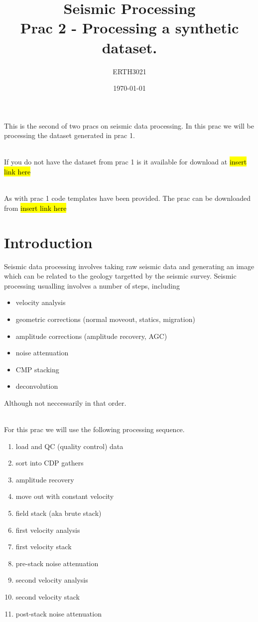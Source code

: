 \documentclass[a4paper, 10pt]{article}
\title{Seismic Processing \\ Prac 2 - Processing a synthetic dataset.} %
\author{ERTH3021} %
\date{\today} %
\begin{document}
\maketitle %
This is the second of two pracs on seismic data processing.  In this prac we will be processing the dataset generated in prac 1.  
\par~\\
If you do not have the dataset from prac 1 is it available for download at \hl{insert link here}
\par~\\
As with prac 1 code templates have been provided. The prac can be downloaded from \hl{insert link here}

\section{Introduction}
Seismic data processing involves taking raw seismic data and generating an image which can be related to the geology targetted by the seismic survey.  Seismic processing usualling involves a number of steps, including
\begin{itemize}
\item velocity analysis
\item geometric corrections (normal moveout,  statics, migration)
\item amplitude corrections (amplitude recovery, AGC)
\item noise attenuation
\item CMP stacking
\item deconvolution
\end{itemize}
Although not neccessarily in that order.
\par~\\
For this prac we will use the following processing sequence.
\begin{enumerate}
\item load and QC (quality control) data
\item sort into CDP gathers
\item amplitude recovery
\item move out with constant velocity
\item field stack (aka brute stack)
\item first velocity analysis
\item first velocity stack
\item pre-stack noise attenuation
\item second velocity analysis
\item second velocity stack
\item post-stack noise attenuation
\end{enumerate}
\end{document}
